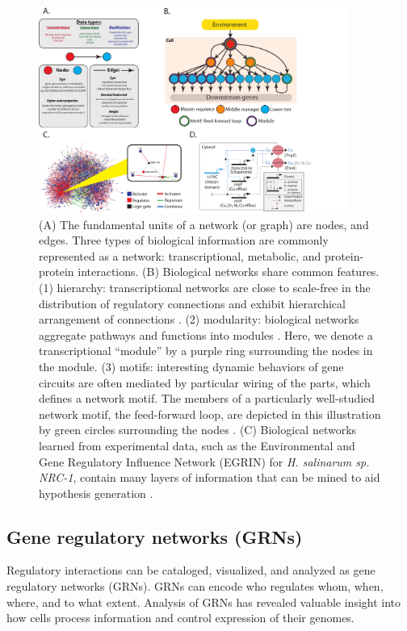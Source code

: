 \begin{figure}[h!]
    \centering
    \includegraphics[width=0.9\textwidth]{figures/review_figure1}
 	\caption[Generation and properties of networks]{
 	(A) The fundamental units of a network (or graph) are nodes, and edges. Three types of biological information are commonly represented as a network: transcriptional, metabolic, and protein-protein interactions. (B) Biological networks share common features. (1) hierarchy: transcriptional networks are close to scale-free in the distribution of regulatory connections and exhibit hierarchical arrangement of connections \cite{barabasi_network_2004}. (2) modularity: biological networks aggregate pathways and functions into modules \cite{hartwell_molecular_1999}. Here, we denote a transcriptional “module” by a purple ring surrounding the nodes in the module. (3) motifs: interesting dynamic behaviors of gene circuits are often mediated by particular wiring of the parts, which defines a network motif. The members of a particularly well-studied network motif, the feed-forward loop, are depicted in this illustration by green circles surrounding the nodes \cite{alon_network_2007}. (C) Biological networks learned from experimental data, such as the Environmental and Gene Regulatory Influence Network (EGRIN) for \textit{H. salinarum sp. NRC-1}, contain many layers of information that can be mined to aid hypothesis generation \cite{bonneau_predictive_2007}.
}
    \label{fig:chap4:networks}
\end{figure}

\subsection{Gene regulatory networks (GRNs)}

Regulatory interactions can be cataloged, visualized, and analyzed as gene regulatory networks (GRNs). GRNs can encode who regulates whom, when, where, and to what extent. Analysis of GRNs has revealed valuable insight into how cells process information \cite{barabasi_network_2004} and control expression of their genomes. 

